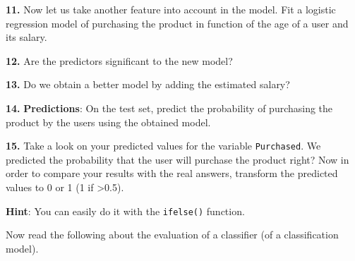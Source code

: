 \documentclass[]{book}
\theoremstyle{definition}
\theoremstyle{definition}
\theoremstyle{definition}
\theoremstyle{remark}
\begin{document}
\textbf{11.} Now let us take another feature into account in the model.
Fit a logistic regression model of purchasing the product in function of
the age of a user and its salary.

\textbf{12.} Are the predictors significant to the new model?

\textbf{13.} Do we obtain a better model by adding the estimated salary?

\textbf{14.} \textbf{Predictions}: On the test set, predict the
probability of purchasing the product by the users using the obtained
model.

\textbf{15.} Take a look on your predicted values for the variable
\texttt{Purchased}. We predicted the probability that the user will
purchase the product right? Now in order to compare your results with
the real answers, transform the predicted values to 0 or 1 (1 if
\textgreater{}0.5).

\textbf{Hint}: You can easily do it with the \texttt{ifelse()} function.

Now read the following about the evaluation of a classifier (of a
classification model).
\end{document}
